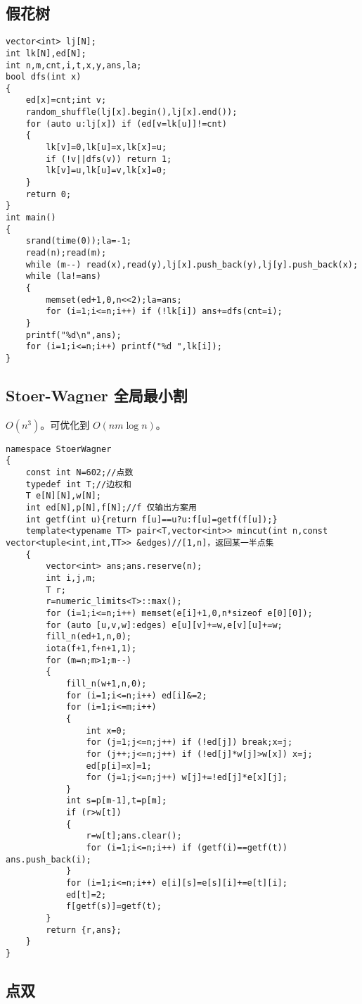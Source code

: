 \documentclass{ctexart}
\begin{document}
\subsection{假花树}

\begin{lstlisting}
vector<int> lj[N];
int lk[N],ed[N];
int n,m,cnt,i,t,x,y,ans,la;
bool dfs(int x)
{
	ed[x]=cnt;int v;
	random_shuffle(lj[x].begin(),lj[x].end());
	for (auto u:lj[x]) if (ed[v=lk[u]]!=cnt)
	{
		lk[v]=0,lk[u]=x,lk[x]=u;
		if (!v||dfs(v)) return 1;
		lk[v]=u,lk[u]=v,lk[x]=0;
	}
	return 0;
}
int main()
{
	srand(time(0));la=-1;
	read(n);read(m);
	while (m--) read(x),read(y),lj[x].push_back(y),lj[y].push_back(x);
	while (la!=ans)
	{
		memset(ed+1,0,n<<2);la=ans;
		for (i=1;i<=n;i++) if (!lk[i]) ans+=dfs(cnt=i);
	}
	printf("%d\n",ans);
	for (i=1;i<=n;i++) printf("%d ",lk[i]);
}
\end{lstlisting}

\subsection{Stoer-Wagner 全局最小割}

$O(n^3)$。可优化到 $O(nm\log n)$。

\begin{lstlisting}
namespace StoerWagner
{
	const int N=602;//点数
	typedef int T;//边权和
	T e[N][N],w[N];
	int ed[N],p[N],f[N];//f 仅输出方案用
	int getf(int u){return f[u]==u?u:f[u]=getf(f[u]);}
	template<typename TT> pair<T,vector<int>> mincut(int n,const vector<tuple<int,int,TT>> &edges)//[1,n]，返回某一半点集
	{
		vector<int> ans;ans.reserve(n);
		int i,j,m;
		T r;
		r=numeric_limits<T>::max();
		for (i=1;i<=n;i++) memset(e[i]+1,0,n*sizeof e[0][0]);
		for (auto [u,v,w]:edges) e[u][v]+=w,e[v][u]+=w;
		fill_n(ed+1,n,0);
		iota(f+1,f+n+1,1);
		for (m=n;m>1;m--)
		{
			fill_n(w+1,n,0);
			for (i=1;i<=n;i++) ed[i]&=2;
			for (i=1;i<=m;i++)
			{
				int x=0;
				for (j=1;j<=n;j++) if (!ed[j]) break;x=j;
				for (j++;j<=n;j++) if (!ed[j]*w[j]>w[x]) x=j;
				ed[p[i]=x]=1;
				for (j=1;j<=n;j++) w[j]+=!ed[j]*e[x][j];
			}
			int s=p[m-1],t=p[m];
			if (r>w[t])
			{
				r=w[t];ans.clear();
				for (i=1;i<=n;i++) if (getf(i)==getf(t)) ans.push_back(i);
			}
			for (i=1;i<=n;i++) e[i][s]=e[s][i]+=e[t][i];
			ed[t]=2;
			f[getf(s)]=getf(t);
		}
		return {r,ans};
	}
}
\end{lstlisting}

\subsection{点双}
\end{document}
